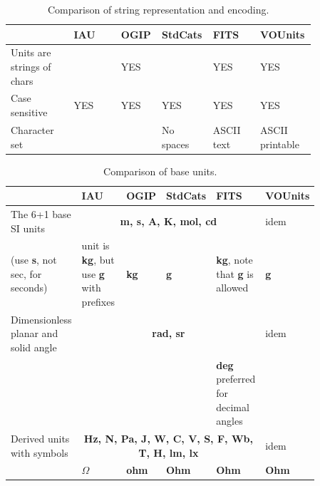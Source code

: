 \documentclass[11pt,notitlepage,onecolumn]{ivoa}
\newcommand{\unit}[1]{\textbf{\textsf{\color{orange}#1}}}
\begin{document}
\begin{table}[hb]
  \begin{tabular}{|p{0.2\linewidth}|p{0.15\linewidth}|p{0.1\linewidth}|p{0.1\linewidth}|p{0.15\linewidth}|p{0.15\linewidth}|}
\hline
    & IAU & OGIP  & StdCats & FITS  & VOUnits\\\hline
    Units are strings of chars &  & YES &  & YES & YES\\\hline
    Case sensitive & YES & YES & YES & YES & YES\\\hline
    Character set &  &  & No spaces & ASCII text & ASCII printable\\\hline
\end{tabular}
  \caption{Comparison of string representation and encoding.}
  \label{tabx:comparUnitEncoding}
\end{table}


\begin{table}[hb]
\begin{tabular}{|p{0.2\linewidth}|p{0.15\linewidth}|p{0.12\linewidth}|p{0.12\linewidth}|p{0.12\linewidth}|p{0.15\linewidth}|}
\hline
    & IAU & OGIP  & StdCats & FITS  & VOUnits\\\hline
    The 6+1 base SI units\raggedright & \multicolumn{4}{c|}{\unit{m, s, A, K, mol, cd}} & idem \\
    \cline{2-6}
    (use \unit{s}, not sec, for seconds)\raggedright & unit is \unit{kg}, but use \unit{g} with prefixes\raggedright & \unit{kg} & \unit{g} & \unit{kg}, note that \unit{g} is allowed & \unit{g}\\
     \hline
    Dimensionless planar and solid angle\raggedright & \multicolumn{4}{c|}{\unit{rad, sr}} & idem \\
    \cline{2-5}
    &  &  &  & \unit{deg} preferred for decimal angles & \\\hline
    Derived units with symbols\raggedright & \multicolumn{4}{c|}{\unit{Hz, N, Pa,
      J, W, C, V, S, F, Wb, T, H, lm, lx}} & idem \\
     & \unit{$\Omega$} & \unit{ohm} & \unit{Ohm} & \unit{Ohm} & \unit{Ohm}\\\hline
\end{tabular}
  \caption{Comparison of base units.}
  \label{tabx:comparUnitBase}
\end{table}
\end{document}
